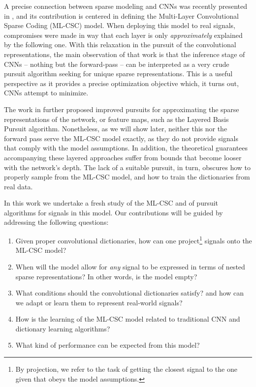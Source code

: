 \documentclass[10pt,journal]{IEEEtran}
\theoremstyle{plain}
\theoremstyle{definition}
\begin{document}
A precise connection between sparse modeling and CNNs was recently presented in \cite{Papyan2016convolutional}, and its contribution is centered in defining the Multi-Layer Convolutional Sparse Coding (ML-CSC) model. When deploying this model to real signals, compromises were made in way that each layer is only \emph{approximately} explained by the following one. With this relaxation in the pursuit of the convolutional representations, the main observation of that work is that the inference stage of CNNs -- nothing but the forward-pass -- can be interpreted as a very crude pursuit algorithm seeking for unique sparse representations. This is a useful perspective as it provides a precise optimization objective which, it turns out, CNNs attempt to minimize.  

The work in \cite{Papyan2016convolutional} further proposed improved pursuits for approximating the sparse representations of the network, or feature maps, such as the Layered Basis Pursuit algorithm. Nonetheless, as we will show later, neither this nor the forward pass serve the ML-CSC model exactly, as they do not provide signals that comply with the model assumptions. In addition, the theoretical guarantees accompanying these layered approaches suffer from bounds that become looser with the network's depth. The lack of a suitable pursuit, in turn, obscures how to properly sample from the ML-CSC model, and how to train the dictionaries from real data.

In this work we undertake a fresh study of the ML-CSC and of pursuit algorithms for signals in this model. Our contributions will be guided by addressing the following questions:

\begin{enumerate}

	\item Given proper convolutional dictionaries, how can one project\footnote{By projection, we refer to the task of getting the closest signal to the one given that obeys the model assumptions.} signals onto the ML-CSC model?

	\item When will the model allow for \emph{any} signal to be expressed in terms of nested sparse representations? In other words, is the model empty?

	\item What conditions should the convolutional dictionaries satisfy? and how can we adapt or learn them to represent real-world signals?

	\item How is the learning of the ML-CSC model related to traditional CNN and dictionary learning algorithms? 

	\item What kind of performance can be expected from this model?

\end{enumerate}
\end{document}
